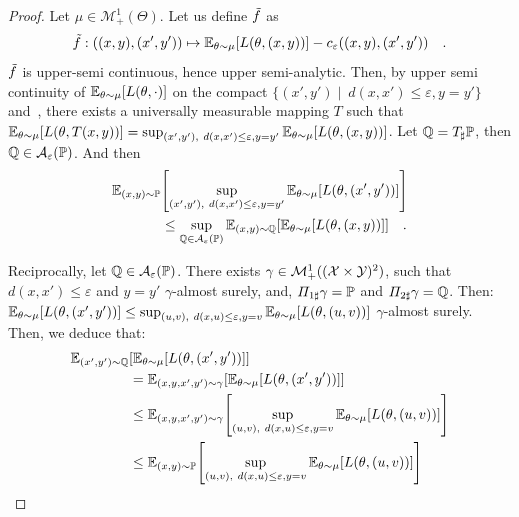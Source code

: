 \begin{proof}
Let $\mu\in\mathcal{M}^1_+(\Theta)$. Let us define $\Tilde{f}$ as
\begin{align*}
    \Tilde{f}:((x,y),(x',y'))\mapsto \mathbb{E}_{\theta\sim\mu}\left[\loss(\theta,(x,y))\right]-c_\varepsilon((x,y),(x',y'))\quad. 
\end{align*}
 $\Tilde{f}$ is upper-semi continuous, hence upper semi-analytic. Then, by upper semi continuity of $\mathbb{E}_{\theta\sim\mu}\left[\loss(\theta,\cdot)\right]$ on the compact $\{(x',y')\mid~d(x,x')\leq\varepsilon,y=y'\}$ and~\citep[Proposition 7.50]{bertsekas2004stochastic}, there exists a universally measurable mapping $T$ such that $\mathbb{E}_{\theta\sim\mu}\left[\loss(\theta,T(x,y))\right]=\sup_{(x',y'),~d(x,x')\leq\varepsilon,y=y'}\mathbb{E}_{\theta\sim\mu}\left[\loss(\theta,(x,y))\right]$.  Let $\mathbb{Q} = T_{\sharp}\mathbb{P}$, then $\mathbb{Q}\in\mathcal{A}_\varepsilon(\mathbb{P})$. And then 
 \begin{align*}
      \mathbb{E}_{(x,y)\sim\PP}&\left[\sup_{(x',y'),~d(x,x')\leq\varepsilon,y=y'}\mathbb{E}_{\theta\sim\mu}\left[\loss(\theta,(x',y'))\right]\right]\\
      &\leq \sup_{\QQ\in\mathcal{A}_\varepsilon(\PP)}\mathbb{E}_{(x,y)\sim\QQ}\left[\mathbb{E}_{\theta\sim\mu}\left[\loss(\theta,(x,y))\right]\right]\quad.
\end{align*}


Reciprocally, let $\mathbb{Q}\in\mathcal{A}_\varepsilon(\mathbb{P})$. There exists $\gamma\in\mathcal{M}^1_+((\mathcal{X}\times\mathcal{Y})^2)$, such that $d(x,x')\leq\varepsilon$ and $y=y'$ $\gamma$-almost surely, and, $\Pi_{1\sharp}\gamma=\mathbb{P}$ and  $\Pi_{2\sharp}\gamma=\mathbb{Q}$. Then:
$\mathbb{E}_{\theta\sim\mu}\left[\loss(\theta,(x',y'))\right]\leq\sup_{(u,v),~d(x,u)\leq\varepsilon,y=v}\mathbb{E}_{\theta\sim\mu}\left[\loss(\theta,(u,v))\right]$ $\gamma$-almost surely. Then, we deduce that:
\begin{align*}
    \mathbb{E}_{(x',y')\sim\QQ}&\left[\mathbb{E}_{\theta\sim\mu}\left[\loss(\theta,(x',y'))\right]\right]\\
    & =     \mathbb{E}_{(x,y,x',y')\sim\gamma}\left[\mathbb{E}_{\theta\sim\mu}\left[\loss(\theta,(x',y'))\right]\right] \\
    &\leq\mathbb{E}_{(x,y,x',y')\sim\gamma}\left[\sup_{(u,v),~d(x,u)\leq\varepsilon,y=v}\mathbb{E}_{\theta\sim\mu}\left[\loss(\theta,(u,v))\right]\right]\\
    &\leq\mathbb{E}_{(x,y)\sim\PP}\left[\sup_{(u,v),~d(x,u)\leq\varepsilon,y=v}\mathbb{E}_{\theta\sim\mu}\left[\loss(\theta,(u,v))\right]\right]
\end{align*}


\end{proof}

